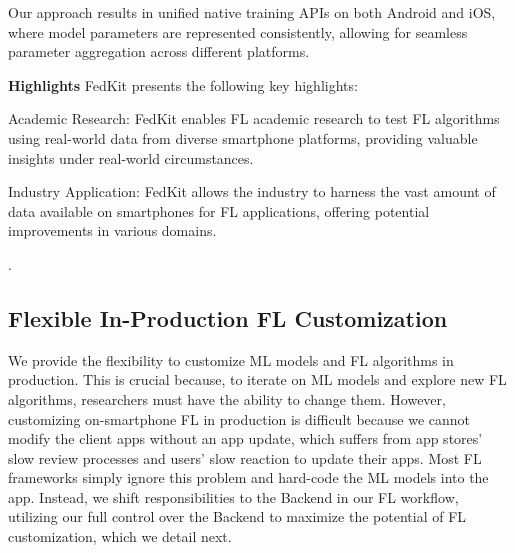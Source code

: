 \documentclass[letterpaper]{article} %
\begin{document}
Our approach results in unified native training APIs on both Android and iOS, where model parameters are represented consistently, allowing for seamless parameter aggregation across different platforms.


\noincident \textbf{Highlights}
FedKit presents the following key highlights:


\begin{enumerate*}[label=\arabic*)]
    \item Academic Research: FedKit enables FL academic research to test FL algorithms using real-world data from diverse smartphone platforms, providing valuable insights under real-world circumstances.
    \item Industry Application: FedKit allows the industry to harness the vast amount of data available on smartphones for FL applications, offering potential improvements in various domains.
\end{enumerate*}.

\subsection{Flexible In-Production FL Customization}
\newcommand{\model}{$M$}
\newcommand{\fs}{$S_\mathrm F$}
We provide the flexibility to customize ML models and FL algorithms
in production.
This is crucial because, to iterate on ML models and explore new FL algorithms,
researchers must have the ability to change them.
However, customizing on-smartphone FL in production is difficult because
we cannot modify the client apps without an app update,
which suffers from app stores' slow review processes and
users' slow reaction to update their apps.
Most FL frameworks simply ignore this problem and
hard-code the ML models into the app.
Instead, we shift responsibilities to the Backend in our FL workflow,
utilizing our full control over the Backend to
maximize the potential of FL customization,
which we detail next.
\end{document}
